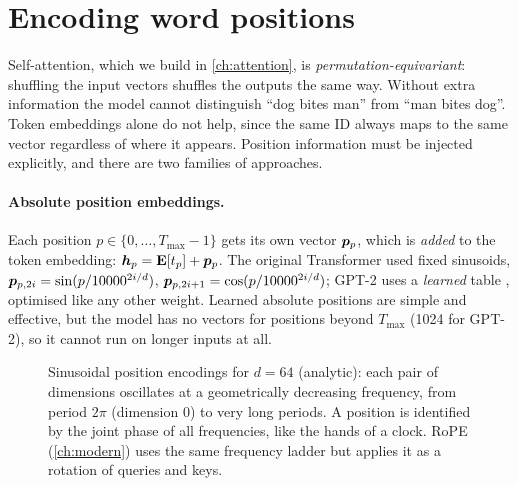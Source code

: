 \section{Encoding word positions}\label{sec:text:positions}

Self-attention, which we build in \cref{ch:attention}, is \emph{permutation-equivariant}: shuffling
the input vectors shuffles the outputs the same way. Without extra information the model cannot
distinguish ``dog bites man'' from ``man bites dog''. Token embeddings alone do not help, since
the same ID always maps to the same vector regardless of where it appears. Position information
must be injected explicitly, and there are two families of approaches.

\paragraph{Absolute position embeddings.} Each position $p\in\{0,\dots,T_{\max}-1\}$ gets its own vector
$\bm{p}_p$, which is \emph{added} to the token embedding: $\bm{h}_p = \mathbf{E}[t_p] + \bm{p}_p$.
The original Transformer used fixed sinusoids,
$\bm{p}_{p,2i}=\sin(p/10000^{2i/d})$, $\bm{p}_{p,2i+1}=\cos(p/10000^{2i/d})$; GPT-2 uses a
\emph{learned} table , optimised like any other weight. Learned
absolute positions are simple and effective, but the model has no vectors for positions beyond
$T_{\max}$ (1024 for GPT-2), so it cannot run on longer inputs at all.

\begin{figure}[t]
\centering
{}
\caption{Sinusoidal position encodings for $d=64$ (analytic): each pair of dimensions oscillates
at a geometrically decreasing frequency, from period $2\pi$ (dimension 0) to very long periods.
A position is identified by the joint phase of all frequencies, like the hands of a clock. RoPE
(\cref{ch:modern}) uses the same frequency ladder but applies it as a rotation of queries and keys.}
\label{fig:text:sinusoid}
\end{figure}


